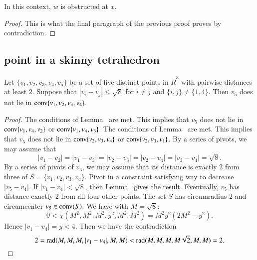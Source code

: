 \begin{lemma}
In this context, $w$ is obstructed at $x$.
\end{lemma}

\begin{proof} This is what the final paragraph of the previous proof proves by contradiction.
\end{proof}



\newpage
\subsection{point in a skinny tetrahedron}



\begin{lemma} 
Let 
$\{v_1,v_2,v_3,v_4,v_5\}$ be a set of 
five distinct points in $\ring{R}^3$
with pairwise distances at least $2$.  Suppose that $|v_i-v_j|\le
\sqrt8$ for $i\ne j$ and $\{i,j\}\ne\{1,4\}$. Then $v_5$ does not lie
in ${\operatorname{conv}}\{v_1,v_2,v_3,v_4\}$.
\end{lemma}


\begin{proof}
The conditions of Lemma~ are met. This implies
that $v_5$ does not lie in ${\operatorname{conv}}\{v_1,v_4,v_2\}$ or
	${\operatorname{conv}}\{v_1,v_4,v_3\}$.
The conditions of Lemma~ are met.  This implies that
$v_5$ does not lie in ${\operatorname{conv}}\{v_2,v_3,v_4\}$ or
	${\operatorname{conv}}\{v_2,v_3,v_1\}$.
By a series of pivots, we may assume that
	$$|v_1-v_2|=|v_1-v_3|=|v_2-v_3|=|v_2-v_4|=|v_3-v_4|=\sqrt8.$$
By a series of pivots of $v_5$, we may assume that its distance is exactly
$2$ from three of $S=\{v_1,v_2,v_3,v_4\}$.  
Pivot in a constraint satisfying way to decrease $|v_5-v_4|$.
If $|v_1-v_4|<\sqrt8$, then Lemma~ %
gives the
result.
Eventually, $v_5$ has distance exactly $2$ from all four other points.
The set $S$ has circumradius $2$ and circumcenter $v_5\in{\operatorname{conv}}(S)$.  
	We have with $M=\sqrt8$:
	$$0 < \chi(M^2,M^2,M^2,y^2,M^2,M^2)= M^2 y^2 (2M^2 - y^2).$$
Hence $|v_1-v_4|=y < 4$.
Then we have the contradiction
	$$2 = \operatorname{rad}(M,M,M,|v_1-v_4|,M,M) 
	 < \operatorname{rad}(M,M,M,M\sqrt{2},M,M)= 2.
	 $$
\end{proof}



